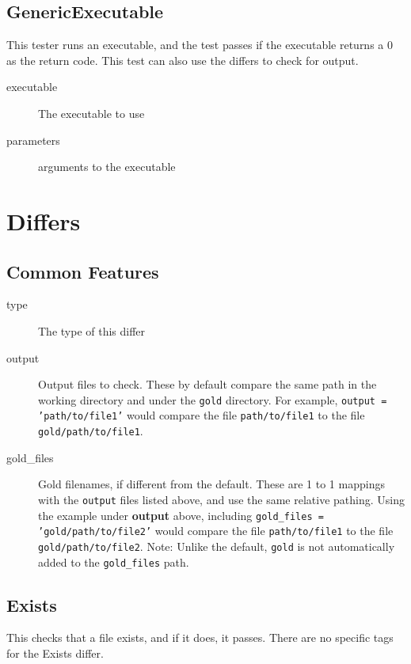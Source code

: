 \documentclass{article}
\begin{document}
\subsection{GenericExecutable}

This tester runs an executable, and the test passes if the executable
returns a 0 as the return code.  This test can also use the differs to
check for output.

\begin{description}
  \item[executable] The executable to use
  \item[parameters] arguments to the executable
\end{description}

\section{Differs}

\subsection{Common Features}

\begin{description}
  \item[type] The type of this differ
  \item[output] Output files to check. These by default compare the same path in the working directory
      and under the \texttt{gold} directory. For example, \texttt{output = 'path/to/file1'} would compare
      the file \texttt{path/to/file1} to the file \texttt{gold/path/to/file1}.
  \item[gold\_files] Gold filenames, if different from the default. These are 1 to 1 mappings with the
      \texttt{output} files listed above, and use the same relative pathing. Using the example under
      \textbf{output} above, including \texttt{gold\_files = 'gold/path/to/file2'} would compare the file
      \texttt{path/to/file1} to the file \texttt{gold/path/to/file2}. Note: Unlike the default,
      \texttt{gold} is not automatically added to the \texttt{gold\_files} path.
\end{description}

\subsection{Exists}

This checks that a file exists, and if it does, it passes.  There are
no specific tags for the Exists differ.
\end{document}
